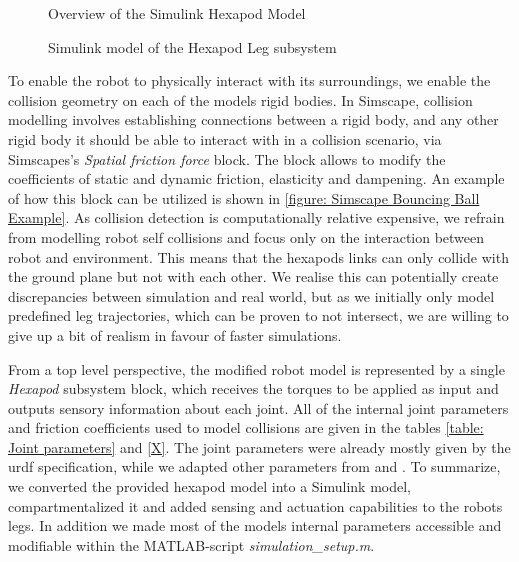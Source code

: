 \begin{figure}[h]
	\centerline{}
	\caption{Overview of the Simulink Hexapod Model}
	\label{figure: Hexapod Model Overview}
\end{figure}

\begin{figure}
	\centerline{}
	\caption{Simulink model of the Hexapod Leg subsystem}
	\label{figure: Hexapod Leg}
\end{figure}

To enable the robot to physically interact with its surroundings, we enable the collision geometry on each of the models rigid bodies.
In Simscape, collision modelling involves establishing connections between a rigid body, and any other rigid body it should be able to interact with in a collision scenario, via Simscapes's \textit{Spatial friction force} block.
The block allows to modify the coefficients of static and dynamic friction, elasticity and dampening.
An example of how this block can be utilized is shown in \ref{figure: Simscape Bouncing Ball Example}.
As collision detection is computationally relative expensive, we refrain from modelling robot self collisions and focus only on the interaction between robot and environment.
This means that the hexapods links can only collide with the ground plane but not with each other.
We realise this can potentially create discrepancies between simulation and real world, but as we initially only model predefined leg trajectories, which can be proven to not intersect, we are willing to give up a bit of realism in favour of faster simulations.

From a top level perspective, the modified robot model is represented by a single \textit{Hexapod} subsystem block, which receives the torques to be applied as input and outputs sensory information about each joint.
All of the internal joint parameters and friction coefficients used to model collisions are given in the tables \ref{table: Joint parameters} and \ref{X}.
The joint parameters were already mostly given by the urdf specification, while we adapted other parameters from \parencite{AUTHOR} and \parencite{AUTHOR2}.
To summarize, we converted the provided hexapod model into a Simulink model, compartmentalized it and added sensing and actuation capabilities to the robots legs.
In addition we made most of the models internal parameters accessible and modifiable within the MATLAB-script \textit{simulation\_setup.m}.



